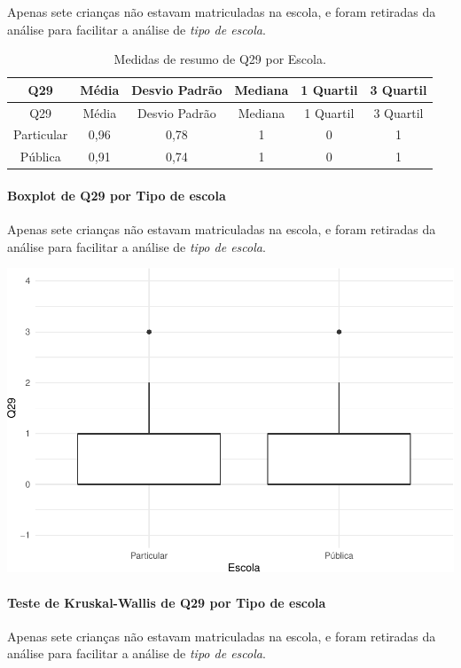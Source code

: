 \documentclass[]{article}
\let\oldparagraph\paragraph
\renewcommand{\paragraph}[1]{\oldparagraph{#1}\mbox{}}
\begin{document}
Apenas sete crianças não estavam matriculadas na escola, e foram retiradas da análise para facilitar a análise de \emph{tipo de escola}.

\begin{longtable}[]{@{}cccccc@{}}
\caption{\label{tab:unnamed-chunk-941}Medidas de resumo de Q29 por Escola.}\tabularnewline
\toprule
Q29 & Média & Desvio Padrão & Mediana & 1 Quartil & 3 Quartil\tabularnewline
\midrule
\endfirsthead
\toprule
Q29 & Média & Desvio Padrão & Mediana & 1 Quartil & 3 Quartil\tabularnewline
\midrule
\endhead
Particular & 0,96 & 0,78 & 1 & 0 & 1\tabularnewline
Pública & 0,91 & 0,74 & 1 & 0 & 1\tabularnewline
\bottomrule
\end{longtable}

\hypertarget{boxplot-de-q29-por-tipo-de-escola}{%
\paragraph{Boxplot de Q29 por Tipo de escola}\label{boxplot-de-q29-por-tipo-de-escola}}

Apenas sete crianças não estavam matriculadas na escola, e foram retiradas da análise para facilitar a análise de \emph{tipo de escola}.

\begin{center}\includegraphics[width=0.75\linewidth]{relatorio_covid19_files/figure-latex/unnamed-chunk-942-1} \end{center}

\hypertarget{teste-de-kruskal-wallis-de-q29-por-tipo-de-escola}{%
\paragraph{Teste de Kruskal-Wallis de Q29 por Tipo de escola}\label{teste-de-kruskal-wallis-de-q29-por-tipo-de-escola}}

Apenas sete crianças não estavam matriculadas na escola, e foram retiradas da análise para facilitar a análise de \emph{tipo de escola}.
\end{document}
